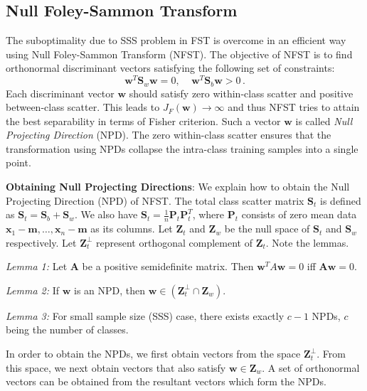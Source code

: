 \documentclass[runningheads]{llncs}
\begin{document}
\subsection{Null Foley-Sammon Transform}
\label{ssec:NFST}
The suboptimality due to SSS problem in FST is overcome in an efficient way using Null Foley-Sammon Transform (NFST). The objective of NFST is to find orthonormal discriminant vectors satisfying the following set of constraints:
\begin{equation}
\label{eqn:NFSTC1}
\mathbf{w}^T \mathbf{S}_w \mathbf{w} = 0, \;\;\;\;
\mathbf{w}^T \mathbf{S}_b \mathbf{w} > 0 \,.
\end{equation}
Each discriminant vector $\mathbf{w}$ should satisfy zero within-class scatter and positive between-class scatter. This leads to $J_F(\mathbf{w}) \to \infty$ and thus NFST tries to attain the best separability in terms of Fisher criterion. Such a vector $\mathbf{w}$ is called \textit{Null Projecting Direction} (NPD).
The zero within-class scatter ensures that the transformation using NPDs collapse the intra-class training samples into a single point.

\setlength{\parskip}{1.5mm}
\noindent \textbf{Obtaining Null Projecting Directions}: We explain how to obtain the Null Projecting Direction (NPD) of NFST. The total class scatter matrix $\mathbf{S}_t$ is defined as $\mathbf{S}_t = \mathbf{S}_b + \mathbf{S}_w $. We also have $\mathbf{S}_t = \frac{1}{n}\mathbf{P}_t \mathbf{P}_t^T$, where $\mathbf{P}_t$ consists of zero mean data $\mathbf{x}_{1}-\mathbf{m},\ldots, \mathbf{x}_{n}-\mathbf{m}$ as its columns.
Let $\mathbf{Z}_t$ and $\mathbf{Z}_w$ be the null space of $\mathbf{S}_t$ and $\mathbf{S}_w$ respectively. Let $\mathbf{Z}^\perp_t$ represent orthogonal complement of $\mathbf{Z}_t$. Note the lemmas\cite{guo:nfst}.
\setlength{\parskip}{0mm}

\textit{Lemma 1:} Let $\mathbf{A}$ be a positive semidefinite matrix. Then $\mathbf{w}^TA\mathbf{w}=0$ iff $\mathbf{A}\mathbf{w}=0$.

\textit{Lemma 2:} If $\mathbf{w}$ is an NPD, then $\mathbf{w} \in (\mathbf{Z}_t^\perp \cap \mathbf{Z}_w)$.

\textit{Lemma 3:} For small sample size (SSS) case, there exists exactly $c-1$ NPDs, $c$ being the number of classes.

In order to obtain the NPDs, we first obtain vectors from the space $\mathbf{Z}_t^\perp$. From this space, we next obtain vectors that also satisfy $\mathbf{w} \in \mathbf{Z}_w$. A set of orthonormal vectors can be obtained from the resultant vectors which form the NPDs.
\end{document}
